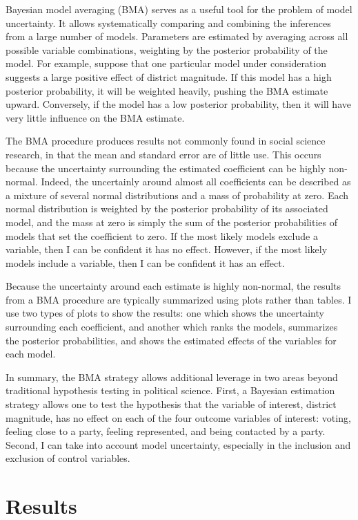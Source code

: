 \documentclass[12pt]{article}
\begin{document}
Bayesian model averaging (BMA) serves as a useful tool for the problem of model uncertainty. It allows systematically comparing and combining the inferences from a large number of models. Parameters are estimated by averaging across all possible variable combinations, weighting by the posterior probability of the model. For example, suppose that one particular model under consideration suggests a large positive effect of district magnitude. If this model has a high posterior probability, it will be weighted heavily, pushing the BMA estimate upward. Conversely, if the model has a low posterior probability, then it will have very little influence on the BMA estimate. 

The BMA procedure produces results not commonly found in social science research, in that the mean and standard error are of little use. This occurs because the uncertainty surrounding the estimated coefficient can be highly non-normal. Indeed, the uncertainly around almost all coefficients can be described as a mixture of several normal distributions and a mass of probability at zero. Each normal distribution is weighted by the posterior probability of its associated model, and the mass at zero is simply the sum of the posterior probabilities of models that set the coefficient to zero. If the most likely models exclude a variable, then I can be confident it has no effect. However, if the most likely models include a variable, then I can be confident it has an effect.  

Because the uncertainty around each estimate is highly non-normal, the results from a BMA procedure are typically summarized using plots rather than tables. I use two types of plots to show the results: one which shows the uncertainty surrounding each coefficient, and another which ranks the models, summarizes the posterior probabilities, and shows the estimated effects of the variables for each model.

In summary, the BMA strategy allows additional leverage in two areas beyond traditional hypothesis testing in political science. First, a Bayesian estimation strategy allows one to test the hypothesis that the variable of interest, district magnitude, has no effect on each of the four outcome variables of interest: voting, feeling close to a party, feeling represented, and being contacted by a party. Second, I can take into account model uncertainty, especially in the inclusion and exclusion of control variables. 

\section*{Results}
\end{document}
